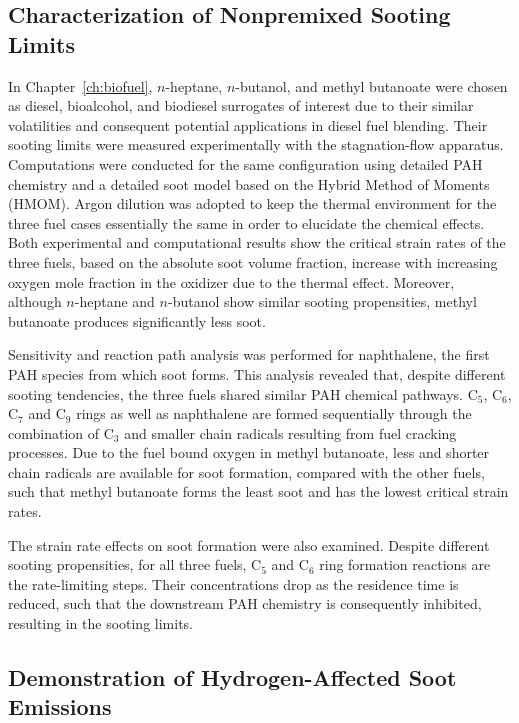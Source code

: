\subsection{Characterization of Nonpremixed Sooting Limits}

In Chapter~\ref{ch:biofuel}, $n$-heptane, $n$-butanol, and methyl butanoate were chosen as diesel, bioalcohol, and biodiesel surrogates of interest due to their similar volatilities and consequent potential applications in diesel fuel blending. Their sooting limits were measured experimentally with the stagnation-flow apparatus. Computations were conducted for the same configuration using detailed PAH chemistry and a detailed soot model based on the Hybrid Method of Moments (HMOM). Argon dilution was adopted to keep the thermal environment for the three fuel cases essentially the same in order to elucidate the chemical effects.  Both experimental and computational results show the critical strain rates of the three fuels, based on the absolute soot volume fraction, increase with increasing oxygen mole fraction in the oxidizer due to the thermal effect. Moreover, although $n$-heptane and $n$-butanol show similar sooting propensities, methyl butanoate produces significantly less soot.

Sensitivity and reaction path analysis was performed for naphthalene, the first PAH species from which soot forms. This analysis revealed that, despite different sooting tendencies, the three fuels shared similar PAH chemical pathways. C$_5$, C$_6$, C$_7$ and C$_9$ rings as well as naphthalene are formed sequentially through the combination of C$_3$ and smaller chain radicals resulting from fuel cracking processes. Due to the fuel bound oxygen in methyl butanoate, less and shorter chain radicals are available for soot formation, compared with the other fuels, such that methyl butanoate forms the least soot and has the lowest critical strain rates.

The strain rate effects on soot formation were also examined. Despite different sooting propensities, for all three fuels, C$_5$ and C$_6$ ring formation reactions are the rate-limiting steps. Their concentrations drop as the residence time is reduced, such that the downstream PAH chemistry is consequently inhibited, resulting in the sooting limits.

\subsection{Demonstration of Hydrogen-Affected Soot Emissions}

